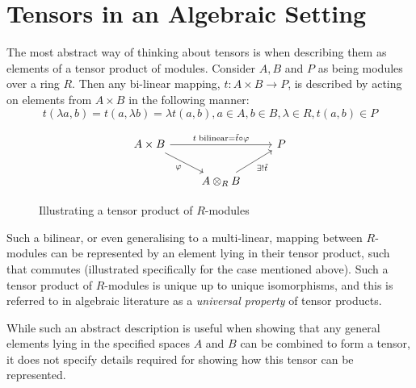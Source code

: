 \documentclass[../Lael_John_MasterThesis_Draft.tex]{subfiles}
\begin{document}
\section{Tensors in an Algebraic Setting}\label{section:tensoralgebra}
The most abstract way of thinking about tensors is when describing them as elements of a tensor product of modules. Consider $A, B$ and $P$ as being modules over a ring $R$. Then any bi-linear mapping, $t: A \times B \to P$, is described by acting on elements from $A \times B$ in the following  manner: 
\begin{equation*}
    t(\lambda a, b) = t(a, \lambda b) = \lambda t(a, b), a \in A, b \in B, \lambda \in R, t(a,b) \in P
\end{equation*}

\begin{figure}[h]
    \[\begin{tikzcd}
        {A \times B} && P \\
        & {A \otimes_R B}
        \arrow["{t\; \text{bilinear} = \tilde{t} \circ \varphi}", from=1-1, to=1-3]
        \arrow["\varphi"', from=1-1, to=2-2]
        \arrow["{\exists !\tilde{t}}"', from=2-2, to=1-3]
    \end{tikzcd}\]
    \caption{Illustrating a tensor product of $R$-modules}\label{fig:tensorcommutativediagram}
\end{figure}

Such a bilinear, or even generalising to a multi-linear, mapping between $R$-modules can be represented by an element lying in their tensor product, such that  commutes \cite{vakil_rising_2025} (illustrated specifically for the case mentioned above). Such a tensor product of $R$-modules is unique up to unique isomorphisms, and this is referred to in algebraic literature as a \textit{universal property} of tensor products.  


While such an abstract description is useful when showing that any general elements lying in the specified spaces $A$ and $B$ can be combined to form a tensor, it does not specify details required for showing how this tensor can be represented. 
\end{document}
